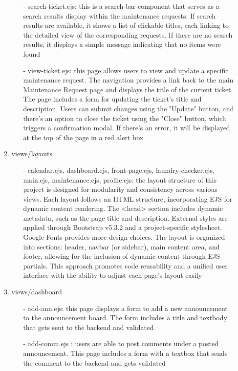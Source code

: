 \documentclass[conference]{IEEEtran}
\begin{document}
\begin{enumerate}
\begin{enumerate}
\begin{itemize}
                    \item[-] search-ticket.ejs: this is a search-bar-component that serves as a search results display within the maintenance requests. If search results are available, it shows a list of clickable titles, each linking to the detailed view of the corresponding requests. If there are no search results, it displays a simple message indicating that no items were found
                    \item[-] view-ticket.ejs: this page allows users to view and update a specific maintenance request. The navigation provides a link back to the main Maintenance Request page and displays the title of the current ticket. The page includes a form for updating the ticket's title and description. Users can submit changes using the "Update" button, and there's an option to close the ticket using the "Close" button, which triggers a confirmation modal. If there's an error, it will be displayed at the top of the page in a red alert box
                \end{itemize}
            \item views/layouts
                \begin{itemize}
                    \item[-] calendar.ejs, dashboard.ejs, front-page.ejs, laundry-checker.ejs, main.ejs, maintenance.ejs, profile.ejs: the layout structure of this project is designed for modularity and consistency across various views. Each layout follows an HTML structure, incorporating EJS for dynamic content rendering. The <head> section includes dynamic metadata, such as the page title and description. External styles are applied through Bootstrap v5.3.2 and a project-specific stylesheet. Google Fonts provides more design-choices. The layout is organized into sections: header, navbar (or sidebar), main content area, and footer, allowing for the inclusion of dynamic content through EJS partials. This approach promotes code reusability and a unified user interface with the ability to adjust each page’s layout easily
                \end{itemize}
            \item views/dashboard
                \begin{itemize}
                    \item[-] add-ann.ejs: this page displays a form to add a new announcement to the announcement board. The form includes a title and textbody that gets sent to the backend and validated
                    \item[-] add-comm.ejs : users are able to post comments under a posted announcement. This page includes a form with a textbox that sends the comment to the backend and gets validated

\end{itemize}
\end{enumerate}
\end{enumerate}
\end{document}
